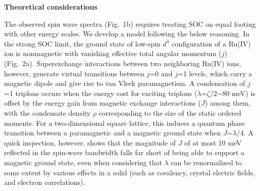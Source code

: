 \vspace{ 10 pt}
\noindent
{\bf Theoretical considerations}

\noindent
The observed spin wave spectra (Fig.~1b) requires treating SOC on equal footing with other energy scales. We develop a model following the below reasoning. In the strong SOC limit, the ground state of low-spin $d^4$ configuration of a Ru(IV) ion is nonmagnetic with vanishing effective total angular momentum ($j$) (Fig.~2a)\cite{Khaliullin_2013,Meetei_2015}. Superexchange interactions between two neighboring Ru(IV) ions, however, generate virtual transitions between $j$=0 and $j$=1 levels, which carry a magnetic dipole and give rise to van Vleck paramagnetism\cite{Khaliullin_2013}. A condensation of $j$=1 triplons occurs when the energy cost for exciting triplons ($\lambda$=$\zeta/2$$\sim$80 meV) is offset by the energy gain from magnetic exchange interactions ($J$) among them, with the condensate density $\rho$ corresponding to the size of the static ordered moments. For a two-dimensional square lattice, this induces a quantum phase transition between a paramagnetic and a magnetic ground state when $J$$\sim$$\lambda/4$. A quick inspection, however, shows that the magnitude of $J$ of at most 10 meV reflected in the spin-wave bandwidth falls far short of being able to support a magnetic ground state, even when considering that $\lambda$ can be renormalized to some extent by various effects in a solid (such as covalency, crystal electric fields, and electron correlations). 

